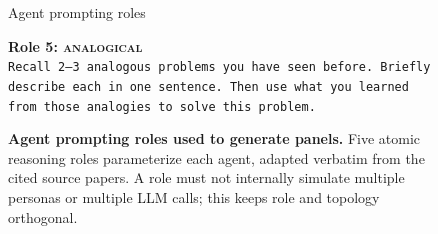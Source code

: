 \begin{figure}[h]
\begin{promptbox}{Agent prompting roles}
\vspace{6pt}

\textbf{Role 5: \textsc{analogical}}~\citep{yasunaga2024largelanguagemodelsanalogical}\\[2pt]
\texttt{Recall 2--3 analogous problems you have seen before.
Briefly describe each in one sentence. Then use what you learned
from those analogies to solve this problem.}
\end{promptbox}

\caption{\textbf{Agent prompting roles used to generate panels.}
Five atomic reasoning roles parameterize each agent, adapted
verbatim from the cited source papers. A role must not internally simulate multiple
personas or multiple LLM calls; this keeps role and topology
orthogonal.}
\label{fig:appendix:role-prompts}
\end{figure}

